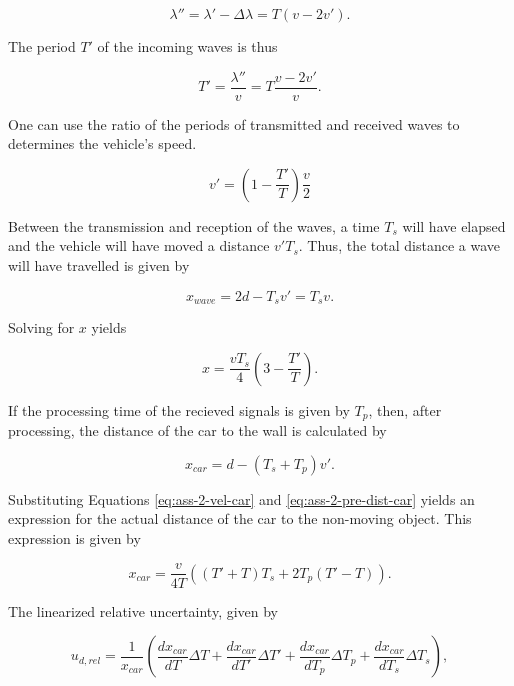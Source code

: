 \documentclass[11pt,titlepage]{report}
\begin{document}
\begin{appendices}
\begin{equation}
	\lambda'' = \lambda' - \Delta \lambda = T (v - 2 v').
\end{equation}

The period $T'$ of the incoming waves is thus

\begin{equation}
	T' = \frac{\lambda''}{v} = T \frac{v - 2 v'}{v}.
\end{equation}

One can use the ratio of the periods of transmitted and received waves to determines the vehicle's speed.

\begin{equation} \label{eq:ass-2-vel-car}
 	v' = \left(1-\frac{T'}{T} \right) \frac{v}{2}
 \end{equation}

Between the transmission and reception of the waves, a time $T_s$ will have elapsed and the vehicle will have moved a distance $v' T_s$. Thus, the total distance a wave will have travelled is given by

\begin{equation}
	x_{wave} = 2 d - T_s v' = T_s v.
\end{equation}

Solving for $x$ yields

\begin{equation} \label{eq:ass-2-pre-dist-car}
	x = \frac{v T_s}{4} \left(3 - \frac{T'}{T} \right).
\end{equation}

If the processing time of the recieved signals is given by $T_p$, then, after processing, the distance of the car to the wall is calculated by

\begin{equation}
	x_{car} = d-(T_s +T_p) v'.
\end{equation}

Substituting Equations \ref{eq:ass-2-vel-car} and \ref{eq:ass-2-pre-dist-car} yields an expression for the actual distance of the car to the non-moving object. This expression is given by

\begin{equation}
	x_{car} = \frac{v}{4 T} \left((T'+T) T_s + 2 T_p (T'-T)  \right).
\end{equation}

The linearized relative uncertainty, given by

\begin{equation}
	u_{d,rel} = \frac{1}{x_{car}} \left( \frac{d x_{car}}{d T} \Delta T + \frac{d x_{car}}{d T'} \Delta T' + \frac{d x_{car}}{d T_p} \Delta T_p + \frac{d x_{car}}{d T_s} \Delta T_s \right),
\end{equation}


\end{appendices}
\end{document}
